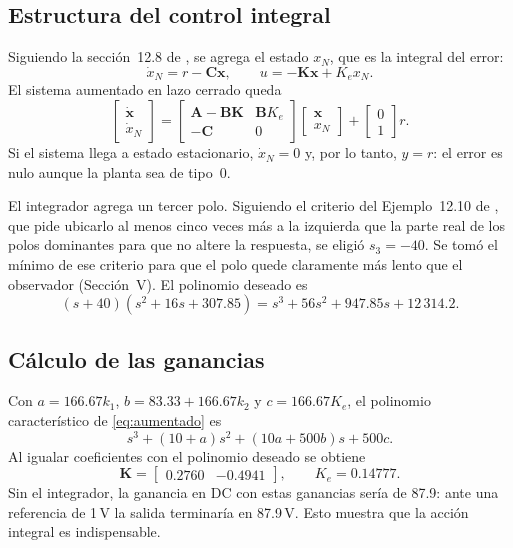 \documentclass[conference,a4paper]{IEEEtran}
\begin{document}
\subsection{Estructura del control integral}
Siguiendo la sección~12.8 de \cite{nise}, se agrega el estado $x_N$, que es la integral del error:
\begin{equation}
\dot{x}_N = r - \mathbf{C}\mathbf{x}, \qquad u = -\mathbf{K}\mathbf{x} + K_e x_N.
\end{equation}
El sistema aumentado en lazo cerrado queda
\begin{equation}
\begin{bmatrix}\dot{\mathbf{x}}\\ \dot{x}_N\end{bmatrix} =
\begin{bmatrix}\mathbf{A} - \mathbf{B}\mathbf{K} & \mathbf{B}K_e\\ -\mathbf{C} & 0\end{bmatrix}
\begin{bmatrix}\mathbf{x}\\ x_N\end{bmatrix} +
\begin{bmatrix}0\\ 1\end{bmatrix} r.
\label{eq:aumentado}
\end{equation}
Si el sistema llega a estado estacionario, $\dot{x}_N = 0$ y, por lo tanto, $y = r$: el error es nulo aunque la planta sea de tipo~0.

El integrador agrega un tercer polo. Siguiendo el criterio del Ejemplo~12.10 de \cite{nise}, que pide ubicarlo al menos cinco veces más a la izquierda que la parte real de los polos dominantes para que no altere la respuesta, se eligió $s_3 = -40$. Se tomó el mínimo de ese criterio para que el polo quede claramente más lento que el observador (Sección~V). El polinomio deseado es
\begin{equation}
(s+40)(s^2+16s+307.85) = s^3 + 56s^2 + 947.85s + 12\,314.2.
\end{equation}

\subsection{Cálculo de las ganancias}
Con $a = 166.67k_1$, $b = 83.33 + 166.67k_2$ y $c = 166.67K_e$, el polinomio característico de \eqref{eq:aumentado} es
\begin{equation}
s^3 + (10 + a)s^2 + (10a + 500b)s + 500c.
\end{equation}
Al igualar coeficientes con el polinomio deseado se obtiene
\begin{equation}
\mathbf{K} = \begin{bmatrix}0.2760 & -0.4941\end{bmatrix}, \qquad K_e = 0.14777.
\end{equation}
Sin el integrador, la ganancia en DC con estas ganancias sería de 87.9: ante una referencia de 1\,V la salida terminaría en 87.9\,V. Esto muestra que la acción integral es indispensable.
\end{document}
